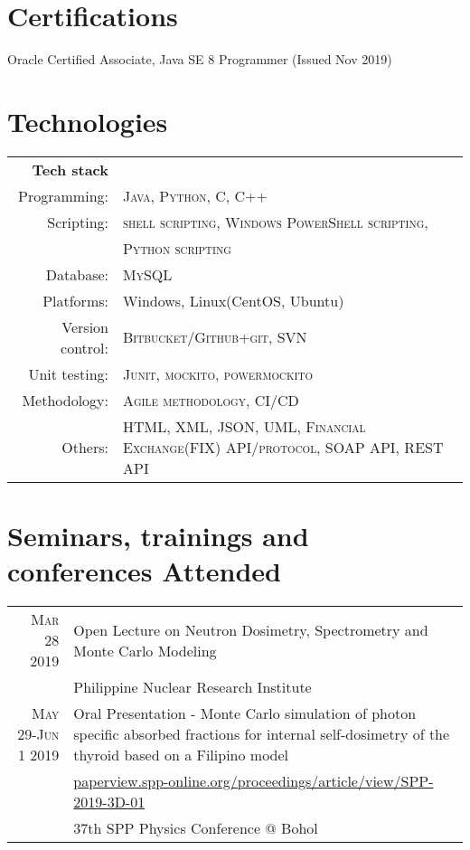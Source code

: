 \documentclass[a4paper,10pt]{article}
\begin{document}
\section{\normalsize Certifications}
\footnotesize Oracle Certified Associate, Java SE 8 Programmer (Issued Nov 2019)



\section{\normalsize Technologies}
\begin{tabular}{rp{11cm}}
\footnotesize \textbf{Tech stack}\\
\footnotesize Programming:      & \footnotesize \textsc{Java, Python, C, C++}\\
\footnotesize Scripting:        & \footnotesize \textsc{shell scripting, Windows PowerShell scripting,}\\
                                &\footnotesize \textsc{Python scripting}\\
\footnotesize Database:         & \footnotesize \textsc{MySQL}\\
\footnotesize Platforms:        & \footnotesize \textsc{}{Windows, Linux(CentOS, Ubuntu)}\\
\footnotesize Version control:  & \footnotesize \textsc{Bitbucket/Github+git, SVN}\\
\footnotesize Unit testing:     & \footnotesize \textsc{Junit, mockito, powermockito}\\
\footnotesize Methodology:      & \footnotesize \textsc{Agile methodology, CI/CD}\\
\footnotesize Others:           & \footnotesize \textsc{HTML, XML, JSON, UML, Financial Exchange(FIX) API/protocol, SOAP API, REST API}\\
 
\end{tabular}


\section{\normalsize Seminars, trainings and conferences Attended}
\begin{tabular}{rp{11cm}}
	\textsc{\footnotesize Mar 28 2019}         	& \footnotesize Open Lecture on Neutron Dosimetry, Spectrometry and Monte Carlo Modeling\\
												& \footnotesize Philippine Nuclear Research Institute\\
	\textsc{\footnotesize May 29-Jun 1 2019}   	& \footnotesize Oral Presentation - Monte Carlo simulation of photon specific absorbed fractions for internal self-dosimetry of the thyroid based on a Filipino model\\
												& \footnotesize \href{https://paperview.spp-online.org/proceedings/article/view/SPP-2019-3D-01}{paperview.spp-online.org/proceedings/article/view/SPP-2019-3D-01}\\
												& \footnotesize 37th SPP Physics Conference @ Bohol
\end{tabular}
\end{document}
